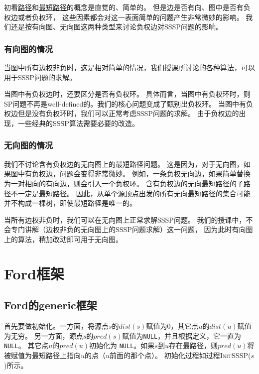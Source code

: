 初看\ul{路径}和\ul{最短路径}的概念是直觉的、简单的。
但是边是否有向、图中是否有负权边或者负权环，
    这些因素都会对这一表面简单的问题产生非常微妙的影响。
我们还是按有向图、无向图这两种类型来讨论负权边对SSSP问题的影响。

\subsubsection{有向图的情况}
    
当图中所有边权非负时，这是相对简单的情况，我们授课所讨论的各种算法，可以用于SSSP问题的求解。

当图中有负权边时，还要区分是否有负权环。
具体而言，当图中有负权环时，则SP问题不再是well-defined的。我们的核心问题变成了甄别出负权环。
当图中有负权边但是没有负权环时，我们可以正常考虑SSSP问题的求解。
由于负权边的出现，一些经典的SSSP算法需要必要的改造。

\subsubsection{无向图的情况}

我们不讨论含有负权边的无向图上的最短路径问题。
这是因为，对于无向图，如果图中有负权边，问题会变得非常微妙。
例如，一条负权无向边，如果简单替换为一对相向的有向边，则会引入一个负权环。
含有负权边的无向最短路径的子路径不一定是最短路径。
因此，从单个源顶点出发的所有无向最短路径的集合可能并不构成一棵树，即使最短路径是唯一的。

当所有边权非负时，我们可以在无向图上正常求解SSSP问题。
我们的授课中，不会专门讲解（边权非负的无向图上的SSSP问题求解）这一问题，
    因为此时有向图上的算法，稍加改动即可用于无向图。

\section{Ford框架} \label{sec:bellman-ford}

\subsection{Ford的generic框架}

首先要做初始化。一方面，将源点$s$的$dist(s)$赋值为0，其它点$u$的$dist(u)$赋值为无穷。
另一方面，源点$s$的$pred(s)$赋值为\texttt{NULL}，并且根据定义，它一直为\texttt{NULL}。
其它点$u$的$pred(u)$初始化为 \texttt{NULL}。如果$s$到$u$存在最路径，则$pred(u)$将被赋值为最短路径上指向$u$的点（$u$前面的那个点）。
初始化过程如过程\textsc{InitSSSP($s$)}所示。%

